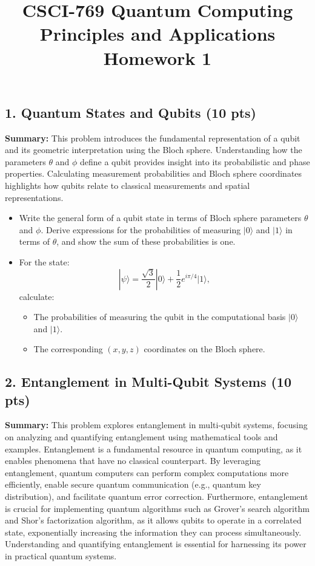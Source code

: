 \documentclass[12pt]{article}
\begin{document}
\title{CSCI-769 Quantum Computing Principles and Applications Homework 1 }
\author{}
\date{}
\maketitle


\subsection*{1. Quantum States and Qubits (10 pts)}

\textbf{Summary:} This problem introduces the fundamental representation of a qubit and its geometric interpretation using the Bloch sphere. Understanding how the parameters $\theta$ and $\phi$ define a qubit provides insight into its probabilistic and phase properties. Calculating measurement probabilities and Bloch sphere coordinates highlights how qubits relate to classical measurements and spatial representations.
\begin{itemize}
   

\item Write the general form of a qubit state in terms of Bloch sphere parameters $\theta$ and $\phi$. Derive expressions for the probabilities of measuring \(|0\rangle\) and \(|1\rangle\) in terms of $\theta$, and show the sum of these probabilities is one. \\
\item For the state:
\[
| \psi \rangle = \frac{\sqrt{3}}{2}|0\rangle + \frac{1}{2}e^{i\pi/4}|1\rangle,
\]
calculate:
\begin{itemize}
    \item The probabilities of measuring the qubit in the computational basis \(|0\rangle\) and \(|1\rangle\).
    \item The corresponding $(x,y,z) $ coordinates on the Bloch sphere.
\end{itemize}
\end{itemize}

\subsection*{2. Entanglement in Multi-Qubit Systems (10 pts)}

\textbf{Summary:} This problem explores entanglement in multi-qubit systems, focusing on analyzing and quantifying entanglement using mathematical tools and examples. Entanglement is a fundamental resource in quantum computing, as it enables phenomena that have no classical counterpart. By leveraging entanglement, quantum computers can perform complex computations more efficiently, enable secure quantum communication (e.g., quantum key distribution), and facilitate quantum error correction. Furthermore, entanglement is crucial for implementing quantum algorithms such as Grover's search algorithm and Shor's factorization algorithm, as it allows qubits to operate in a correlated state, exponentially increasing the information they can process simultaneously. Understanding and quantifying entanglement is essential for harnessing its power in practical quantum systems.
\end{document}
